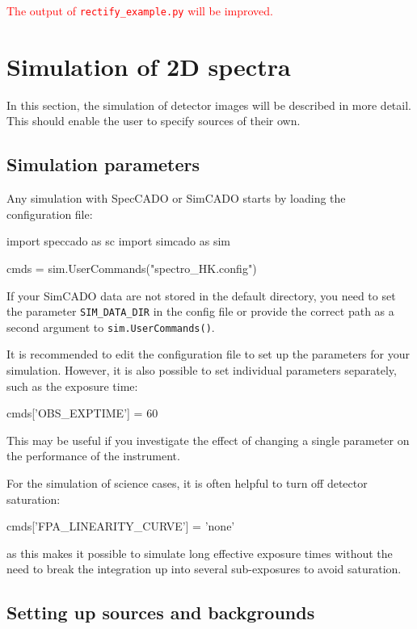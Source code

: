 \documentclass[a4paper,twoside,11pt]{article}
\begin{document}
\textcolor{red}{The output of \lstinline{rectify_example.py} will be
  improved.}


\section{Simulation of 2D spectra}
\label{sec:simulation}

In this section, the simulation of detector images will be described
in more detail. This should enable the user to specify sources of
their own.

\subsection{Simulation parameters}
\label{ssec:simulation_parameters}

Any simulation with SpecCADO or SimCADO starts by loading the
configuration file:
\begin{pyin}
import speccado as sc
import simcado as sim

cmds = sim.UserCommands("spectro_HK.config")
\end{pyin}
If your SimCADO data are not stored in the default directory, you need
to set the parameter \lstinline{SIM_DATA_DIR} in the config file or
provide the correct path as a second argument to
\lstinline{sim.UserCommands()}.

It is recommended to edit the configuration file to set up the
parameters for your simulation. However, it is also possible to set
individual parameters separately, such as the exposure time:
\begin{pyin}
cmds['OBS_EXPTIME'] = 60
\end{pyin}
This may be useful if you investigate the effect of changing a single
parameter on the performance of the instrument.

For the simulation of science cases, it is often helpful to turn off
detector saturation:
\begin{pyin}
cmds['FPA_LINEARITY_CURVE'] = 'none'
\end{pyin}
as this makes it possible to simulate long effective exposure times
without the need to break the integration up into several
sub-exposures to avoid saturation.

\subsection{Setting up sources and backgrounds}
\label{ssec:simulation_sources}
\end{document}
